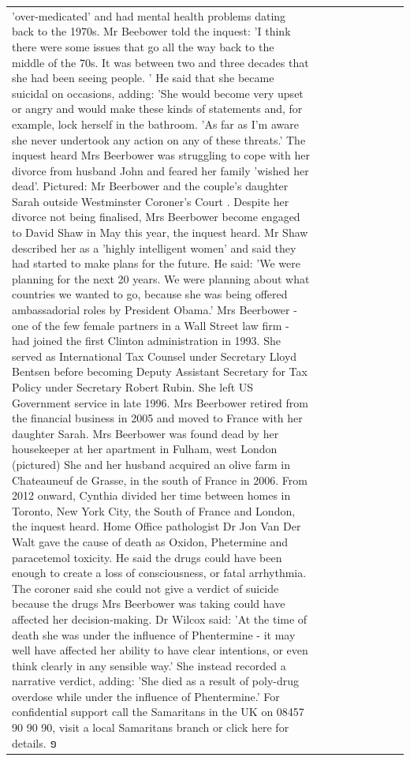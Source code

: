 \begin{table}[H]
\begin{tabular}{lllrlllll}
'over-medicated' and had mental health problems dating back to the 1970s. Mr Beebower told the inquest: 'I think there were some issues that go all the way back to the middle of the 70s. It was between two and three decades that she had been seeing people. ' He said that she became suicidal on occasions, adding: 'She would become very upset or angry and would make these kinds of statements and, for example, lock herself in the bathroom. 'As far as I'm aware she never undertook any action on any of these threats.' The inquest heard Mrs Beerbower was struggling to cope with her divorce from husband John and feared her family 'wished her dead'. Pictured: Mr Beerbower and the couple's daughter Sarah outside Westminster Coroner's Court . Despite her divorce not being finalised, Mrs Beerbower become engaged to David Shaw in May this year, the inquest heard. Mr Shaw described her as a 'highly intelligent women' and said they had started to make plans for the future. He said: 'We were planning for the next 20 years. We were planning about what countries we wanted to go, because she was being offered ambassadorial roles by President Obama.' Mrs Beerbower - one of the few female partners in a Wall Street law firm - had joined the first Clinton administration in 1993. She served as International Tax Counsel under Secretary Lloyd Bentsen before becoming Deputy Assistant Secretary for Tax Policy under Secretary Robert Rubin. She left US Government service in late 1996. Mrs Beerbower retired from the financial business in 2005 and moved to France with her daughter Sarah. Mrs Beerbower was found dead by her housekeeper at her apartment in Fulham, west London (pictured) She and her husband acquired an olive farm in Chateauneuf de Grasse, in the south of France in 2006. From 2012 onward, Cynthia divided her time between homes in Toronto, New York City, the South of France and London, the inquest heard. Home Office pathologist Dr Jon Van Der Walt gave the cause of death as Oxidon, Phetermine and paracetemol toxicity. He said the drugs could have been enough to create a loss of consciousness, or fatal arrhythmia. The coroner said she could not give a verdict of suicide because the drugs Mrs Beerbower was taking could have affected her decision-making. Dr Wilcox said: 'At the time of death she was under the influence of Phentermine - it may well have affected her ability to have clear intentions, or even think clearly in any sensible way.' She instead recorded a narrative verdict, adding: 'She died as a result of poly-drug overdose while under the influence of Phentermine.' For confidential support call the Samaritans in the UK on 08457 90 90 90, visit a local Samaritans branch or click here for details. ១ \\

\end{tabular}
\end{table}
